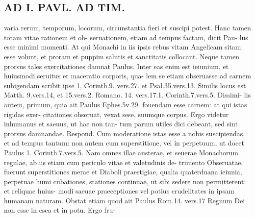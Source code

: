 \documentclass{article}
\begin{document}
\begin{pages}
\section*{AD I. PAVL. AD TIM. }
\marginpar{[ p.210 ]}varia rerum, temporum, locorum, circunstantia fieri et suscipi potest. Hanc tamen totam vitae rationem et ob- seruationem, etiam ad tempus factam, dicit Pau- lus esse minimi momenti. At qui Monachi in iis ipsis rebus vitam Angelicam sitam esse volunt, et proram et puppim salutis et sanctitatis collocant. Neque tamen prorsus tales exercitationes damnat Paulus. Inter eas enim est ieiunium, et huiusmodi seruitus et maceratio corporis, qua- lem se etiam obseruasse ad carnem subigendam scribit ipse 1, Corinth.9. vers.27. et Psal.35.vers.13. Similis locus est Matth. 9.vers.14, et 15.vers.2. Romano. 14. vers.17.1. Corinth.7.vers.5. Dissimi- lis autem, primum, quia ait Paulus Ephes.5v.29. fouendam esse carnem: at qui istas rigidas exer- citationes obseruat, vexat sese, suumque corpus. Ergo videtur inhumanus et saeuus, ut hae non tan- tum parum utiles dici debeant, sed sint prorsus damnandae. Respond. Cum moderatione istas esse a nobis suscipiendas, et ad tempus tantum: non autem cum superstitione, vel in perpetuum, ut docet Paulus 1. Corinth.7.vers.5. Nam omnes illae austerae, et seuerae Monachorum regulae, ab iis etiam cum periculo vitae et valetudinis de- trimento Obseruatae, fuerunt superstitiones merae et Diaboli praestigiae, qualia quaterduana ieiunia, perpetuae humi cubationes, stationes continuae, ut sibi sedere non permitterent: et reliquae huius- modi saeuae praeceptiones vel potius crudelitates in ipsam humanam naturam. Obstat etiam quod ait Paulus Rom.14. vers.17 Regnum Dei non esse in esca et in potu. Ergo fru- 

\end{pages}
\end{document}
